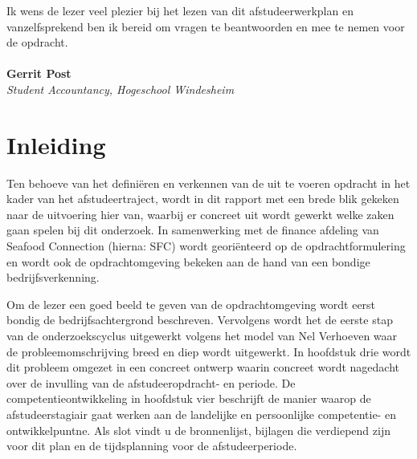 \documentclass[10pt,a4paper,twoside]{report}
\begin{document}
Ik wens de lezer veel plezier bij het lezen van dit afstudeerwerkplan en vanzelfsprekend ben ik bereid om vragen te beantwoorden en mee te nemen voor de opdracht. \\
\\
\textbf{Gerrit Post}\\
\textit{Student Accountancy, Hogeschool Windesheim}




\setcounter{page}{3} %
\tableofcontents
\thispagestyle{empty}


\chapter*{Inleiding}
Ten behoeve van het definiëren en verkennen van de uit te voeren opdracht in het kader van het afstudeertraject, wordt in dit rapport met een brede blik gekeken naar de uitvoering hier van, waarbij er concreet uit wordt gewerkt welke zaken gaan spelen bij dit onderzoek. In samenwerking met de finance afdeling van Seafood Connection (hierna: SFC) wordt georiënteerd op de opdrachtformulering en wordt ook de opdrachtomgeving bekeken aan de hand van een bondige bedrijfsverkenning. 

Om de lezer een goed beeld te geven van de opdrachtomgeving wordt eerst bondig de bedrijfsachtergrond beschreven. Vervolgens wordt het de eerste stap van de onderzoekscyclus uitgewerkt volgens het model van Nel Verhoeven waar de probleemomschrijving breed en diep wordt uitgewerkt. In hoofdstuk drie wordt dit probleem omgezet in een concreet ontwerp waarin concreet wordt nagedacht over de invulling van de afstudeeropdracht- en periode. De competentieontwikkeling in hoofdstuk vier beschrijft de manier waarop de afstudeerstagiair gaat werken aan de landelijke en persoonlijke competentie- en ontwikkelpuntne. Als slot vindt u de bronnenlijst, bijlagen die verdiepend zijn voor dit plan en de tijdsplanning voor de afstudeerperiode. 
\end{document}
